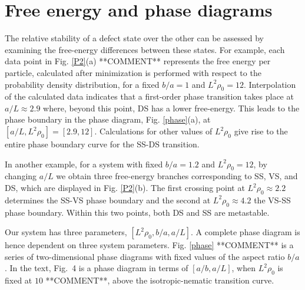 \documentclass[pre,twocolumn,preprintnumbers,reprint]{revtex4}
\begin{document}
\section*{Free energy and phase diagrams}


The relative stability of a defect state over the other can be assessed by examining the free-energy differences between these states. For example, each data point in Fig. \ref{P2}(a) **COMMENT** represents the free energy per particle, calculated after minimization is performed with respect to the probability density distribution, for a fixed $b/a=1$ and $L^2\rho_0 =12$. Interpolation of the calculated data indicates that a first-order phase transition takes place at $a/L \approx 2.9$ where, beyond this point, DS has a lower free-energy. This leads to the phase boundary in the phase diagram, Fig. \ref{phase}(a), at $[a/L, L^2 \rho_0]= [2.9,12]$. Calculations for other values of $L^2\rho_0$ give rise to the entire phase boundary curve for the SS-DS transition.

In another example, for a system with fixed $b/a=1.2$ and $L^2\rho_0=12$, by changing $a/L$ we obtain three free-energy branches corresponding to SS, VS, and DS, which are displayed in Fig. \ref{P2}(b). The first crossing point at $L^2 \rho_0 \approx 2.2 $ determines the SS-VS phase boundary and the second at $L^2 \rho_0 \approx 4.2$
the VS-SS phase boundary. Within this two points, both DS and SS are metastable.

Our system has three parameters, $[L^2 \rho_0, b/a, a/L]$. A complete phase diagram is hence dependent on three system parameters. Fig. \ref{phase} **COMMENT** is a series of two-dimensional phase diagrams with fixed values of the aspect ratio $b/a$. In the text, Fig.~4 is a phase diagram in terms of $[a/b, a/L]$, when $L^2\rho_0$ is fixed at $10$ **COMMENT**, above the isotropic-nematic transition curve.




%


\end{document}
